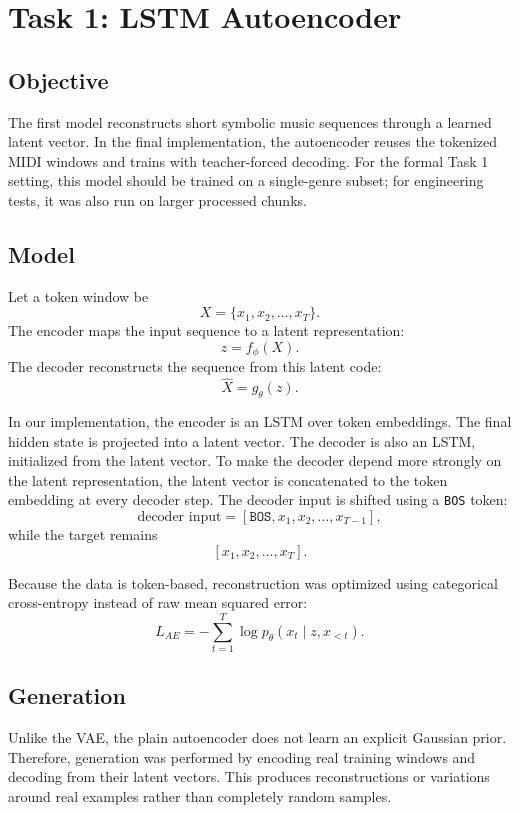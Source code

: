 \documentclass{article}
\begin{document}
\section{Task 1: LSTM Autoencoder}

\subsection{Objective}
The first model reconstructs short symbolic music sequences through a learned latent vector. In the final implementation, the autoencoder reuses the tokenized MIDI windows and trains with teacher-forced decoding. For the formal Task 1 setting, this model should be trained on a single-genre subset; for engineering tests, it was also run on larger processed chunks.

\subsection{Model}
Let a token window be
\[
X = \{x_1, x_2, \ldots, x_T\}.
\]
The encoder maps the input sequence to a latent representation:
\[
z = f_{\phi}(X).
\]
The decoder reconstructs the sequence from this latent code:
\[
\hat{X} = g_{\theta}(z).
\]

In our implementation, the encoder is an LSTM over token embeddings. The final hidden state is projected into a latent vector. The decoder is also an LSTM, initialized from the latent vector. To make the decoder depend more strongly on the latent representation, the latent vector is concatenated to the token embedding at every decoder step. The decoder input is shifted using a \texttt{BOS} token:
\[
\text{decoder input} = [\texttt{BOS}, x_1, x_2, \ldots, x_{T-1}],
\]
while the target remains
\[
[x_1, x_2, \ldots, x_T].
\]

Because the data is token-based, reconstruction was optimized using categorical cross-entropy instead of raw mean squared error:
\[
L_{AE} = -\sum_{t=1}^{T} \log p_{\theta}(x_t \mid z, x_{<t}).
\]

\subsection{Generation}
Unlike the VAE, the plain autoencoder does not learn an explicit Gaussian prior. Therefore, generation was performed by encoding real training windows and decoding from their latent vectors. This produces reconstructions or variations around real examples rather than completely random samples.
\end{document}
